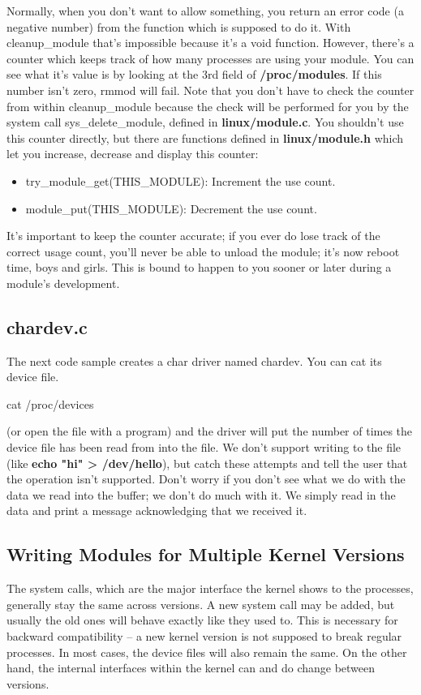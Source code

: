 \documentclass[10pt, oneside]{book}
\begin{document}
Normally, when you don't want to allow something, you return an error code (a negative number) from the function which is supposed to do it. With cleanup\_module that's impossible because it's a void function. However, there's a counter which keeps track of how many processes are using your module. You can see what it's value is by looking at the 3rd field of \textbf{/proc/modules}. If this number isn't zero, rmmod will fail. Note that you don't have to check the counter from within cleanup\_module because the check will be performed for you by the system call sys\_delete\_module, defined in \textbf{linux/module.c}. You shouldn't use this counter directly, but there are functions defined in \textbf{linux/module.h} which let you increase, decrease and display this counter:

\begin{itemize}
\item try\_module\_get(THIS\_MODULE): Increment the use count.
\item module\_put(THIS\_MODULE): Decrement the use count.
\end{itemize}

It's important to keep the counter accurate; if you ever do lose track of the correct usage count, you'll never be able to unload the module; it's now reboot time, boys and girls. This is bound to happen to you sooner or later during a module's development.

\subsection{chardev.c}
\label{sec:org7ce767e}
The next code sample creates a char driver named chardev. You can cat its device file.

\begin{codebash}
cat /proc/devices
\end{codebash}

(or open the file with a program) and the driver will put the number of times the device file has been read from into the file. We don't support writing to the file (like \textbf{echo "hi" > /dev/hello}), but catch these attempts and tell the user that the operation isn't supported. Don't worry if you don't see what we do with the data we read into the buffer; we don't do much with it. We simply read in the data and print a message acknowledging that we received it.


\subsection{Writing Modules for Multiple Kernel Versions}
\label{sec:org6b50b84}
The system calls, which are the major interface the kernel shows to the processes, generally stay the same across versions. A new system call may be added, but usually the old ones will behave exactly like they used to. This is necessary for backward compatibility -- a new kernel version is not supposed to break regular processes. In most cases, the device files will also remain the same. On the other hand, the internal interfaces within the kernel can and do change between versions.
\end{document}
